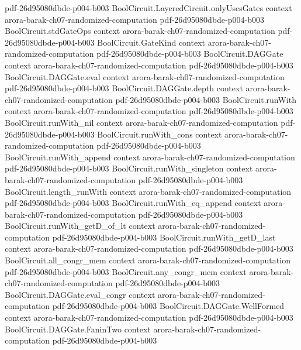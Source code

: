 \begin{theorem}
  {pdf-26d95080dbde-p004-b003}
\proofstep
  {BoolCircuit.LayeredCircuit.onlyUsesGates}
  {context}
  {arora-barak-ch07-randomized-computation}
  {pdf-26d95080dbde-p004-b003}
\proofstep
  {BoolCircuit.stdGateOps}
  {context}
  {arora-barak-ch07-randomized-computation}
  {pdf-26d95080dbde-p004-b003}
\proofstep
  {BoolCircuit.GateKind}
  {context}
  {arora-barak-ch07-randomized-computation}
  {pdf-26d95080dbde-p004-b003}
\proofstep
  {BoolCircuit.DAGGate}
  {context}
  {arora-barak-ch07-randomized-computation}
  {pdf-26d95080dbde-p004-b003}
\proofstep
  {BoolCircuit.DAGGate.eval}
  {context}
  {arora-barak-ch07-randomized-computation}
  {pdf-26d95080dbde-p004-b003}
\proofstep
  {BoolCircuit.DAGGate.depth}
  {context}
  {arora-barak-ch07-randomized-computation}
  {pdf-26d95080dbde-p004-b003}
\proofstep
  {BoolCircuit.runWith}
  {context}
  {arora-barak-ch07-randomized-computation}
  {pdf-26d95080dbde-p004-b003}
\proofstep
  {BoolCircuit.runWith_nil}
  {context}
  {arora-barak-ch07-randomized-computation}
  {pdf-26d95080dbde-p004-b003}
\proofstep
  {BoolCircuit.runWith_cons}
  {context}
  {arora-barak-ch07-randomized-computation}
  {pdf-26d95080dbde-p004-b003}
\proofstep
  {BoolCircuit.runWith_append}
  {context}
  {arora-barak-ch07-randomized-computation}
  {pdf-26d95080dbde-p004-b003}
\proofstep
  {BoolCircuit.runWith_singleton}
  {context}
  {arora-barak-ch07-randomized-computation}
  {pdf-26d95080dbde-p004-b003}
\proofstep
  {BoolCircuit.length_runWith}
  {context}
  {arora-barak-ch07-randomized-computation}
  {pdf-26d95080dbde-p004-b003}
\proofstep
  {BoolCircuit.runWith_eq_append}
  {context}
  {arora-barak-ch07-randomized-computation}
  {pdf-26d95080dbde-p004-b003}
\proofstep
  {BoolCircuit.runWith_getD_of_lt}
  {context}
  {arora-barak-ch07-randomized-computation}
  {pdf-26d95080dbde-p004-b003}
\proofstep
  {BoolCircuit.runWith_getD_last}
  {context}
  {arora-barak-ch07-randomized-computation}
  {pdf-26d95080dbde-p004-b003}
\proofstep
  {BoolCircuit.all_congr_mem}
  {context}
  {arora-barak-ch07-randomized-computation}
  {pdf-26d95080dbde-p004-b003}
\proofstep
  {BoolCircuit.any_congr_mem}
  {context}
  {arora-barak-ch07-randomized-computation}
  {pdf-26d95080dbde-p004-b003}
\proofstep
  {BoolCircuit.DAGGate.eval_congr}
  {context}
  {arora-barak-ch07-randomized-computation}
  {pdf-26d95080dbde-p004-b003}
\proofstep
  {BoolCircuit.DAGGate.WellFormed}
  {context}
  {arora-barak-ch07-randomized-computation}
  {pdf-26d95080dbde-p004-b003}
\proofstep
  {BoolCircuit.DAGGate.FaninTwo}
  {context}
  {arora-barak-ch07-randomized-computation}
  {pdf-26d95080dbde-p004-b003}

\end{theorem}
